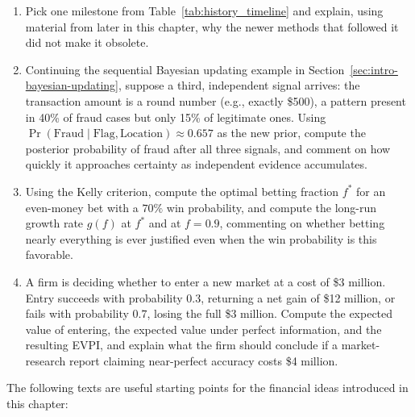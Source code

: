 \documentclass[../ai_in_finance]{subfiles}
\begin{document}
\begin{enumerate}[exercises]
    \item Pick one milestone from Table~\ref{tab:history_timeline} and explain, using material from later in this chapter, why the newer methods that followed it did not make it obsolete.
    \item Continuing the sequential Bayesian updating example in Section~\ref{sec:intro-bayesian-updating}, suppose a third, independent signal arrives: the transaction amount is a round number (e.g., exactly \$500), a pattern present in 40\% of fraud cases but only 15\% of legitimate ones. Using $\Pr(\text{Fraud}\mid\text{Flag},\text{Location}) \approx 0.657$ as the new prior, compute the posterior probability of fraud after all three signals, and comment on how quickly it approaches certainty as independent evidence accumulates.
    \item Using the Kelly criterion, compute the optimal betting fraction $f^*$ for an even-money bet with a $70\%$ win probability, and compute the long-run growth rate $g(f)$ at $f^*$ and at $f=0.9$, commenting on whether betting nearly everything is ever justified even when the win probability is this favorable.
    \item A firm is deciding whether to enter a new market at a cost of \$3 million. Entry succeeds with probability $0.3$, returning a net gain of \$12 million, or fails with probability $0.7$, losing the full \$3 million. Compute the expected value of entering, the expected value under perfect information, and the resulting EVPI, and explain what the firm should conclude if a market-research report claiming near-perfect accuracy costs \$4 million.
\end{enumerate}


The following texts are useful starting points for the financial ideas introduced in this chapter:
\end{document}
